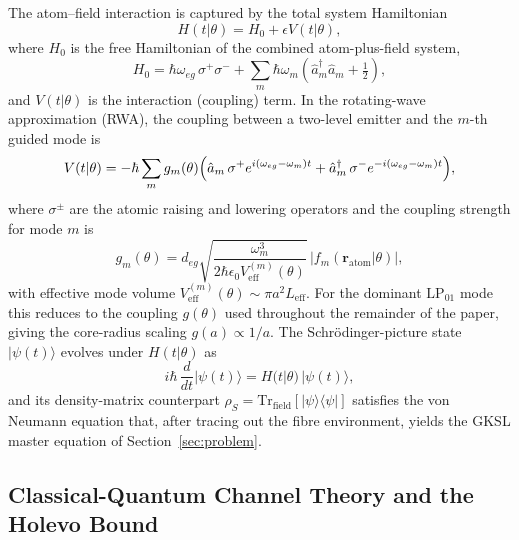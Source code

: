 \documentclass[journal,twocolumn]{IEEEtran}
\theoremstyle{definition}
\theoremstyle{plain}
\newcommand{\Tr}{\mathrm{Tr}}
\begin{document}
The atom--field interaction is captured by the total system
Hamiltonian
\begin{equation}
  H(t|\theta) = H_0 + \epsilon V(t|\theta),
  \label{eq:total_H}
\end{equation}
where $H_0$ is the free Hamiltonian of the combined
atom-plus-field system,
\begin{equation}
  H_0 = \hbar\omega_{eg}\,\sigma^+\sigma^-
    + \sum_m \hbar\omega_m\!\left(\hat{a}_m^\dagger\hat{a}_m
      + \tfrac{1}{2}\right),
  \label{eq:H0}
\end{equation}
and $V(t|\theta)$ is the interaction (coupling) term.  In the
rotating-wave approximation (RWA), the coupling between a
two-level emitter and the $m$-th guided mode is
\begin{equation}
  V(t|\theta) = -\hbar\sum_m g_m(\theta)
    \Bigl(\hat{a}_m\,\sigma^+ e^{i(\omega_{eg}-\omega_m)t}
    + \hat{a}_m^\dagger\,\sigma^- e^{-i(\omega_{eg}-\omega_m)t}
    \Bigr),
  \label{eq:Vt}
\end{equation}
where $\sigma^\pm$ are the atomic raising and lowering operators and
the coupling strength for mode $m$ is
\begin{equation}
  g_m(\theta) = d_{eg}\sqrt{\frac{\omega_m^3}
    {2\hbar\epsilon_0 V_{\mathrm{eff}}^{(m)}(\theta)}}\,
  \bigl|f_m(\mathbf{r}_{\mathrm{atom}}|\theta)\bigr|,
  \label{eq:gm}
\end{equation}
with effective mode volume $V_{\mathrm{eff}}^{(m)}(\theta) \sim
\pi a^2 L_{\mathrm{eff}}$.  For the dominant $\mathrm{LP}_{01}$
mode this reduces to the coupling $g(\theta)$ used throughout
the remainder of the paper, giving the core-radius scaling
$g(a)\propto 1/a$.  The Schr\"{o}dinger-picture state
$|\psi(t)\rangle$ evolves under $H(t|\theta)$ as
\begin{equation}
  i\hbar\,\frac{d}{dt}|\psi(t)\rangle
  = H(t|\theta)\,|\psi(t)\rangle,
  \label{eq:schrodinger}
\end{equation}
and its density-matrix counterpart $\rho_S = \Tr_{\mathrm{field}}
[|\psi\rangle\langle\psi|]$ satisfies the von Neumann equation that,
after tracing out the fibre environment, yields the GKSL master
equation of Section~\ref{sec:problem}.

\subsection{Classical-Quantum Channel Theory and the Holevo Bound}
\end{document}
